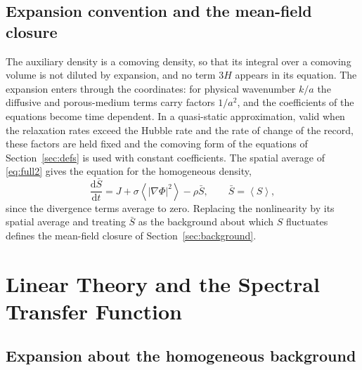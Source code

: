 \documentclass[11pt]{article}
\theoremstyle{definition}
\theoremstyle{remark}
\newcommand{\dd}{\mathrm{d}}
\newcommand{\Sb}{\bar{S}}
\newcommand{\avg}[1]{\left\langle #1 \right\rangle}
\begin{document}
\subsection{Expansion convention and the mean-field closure}

The auxiliary density is a comoving density, so that its integral over a comoving volume is not diluted by expansion, and no term $3H$ appears in its equation. The expansion enters through the coordinates: for physical wavenumber $k/a$ the diffusive and porous-medium terms carry factors $1/a^2$, and the coefficients of the equations become time dependent. In a quasi-static approximation, valid when the relaxation rates exceed the Hubble rate and the rate of change of the record, these factors are held fixed and the comoving form of the equations of Section~\ref{sec:defs} is used with constant coefficients. The spatial average of \eqref{eq:full2} gives the equation for the homogeneous density,
\begin{equation}
\frac{\dd\Sb}{\dd t}=J+\sigma\avg{|\nabla\Phi|^2}-\rho\Sb,\qquad\Sb=\avg S,
\end{equation}
since the divergence terms average to zero. Replacing the nonlinearity by its spatial average and treating $\Sb$ as the background about which $S$ fluctuates defines the mean-field closure of Section~\ref{sec:background}.

\section{Linear Theory and the Spectral Transfer Function}\label{sec:linear}

\subsection{Expansion about the homogeneous background}
\end{document}

